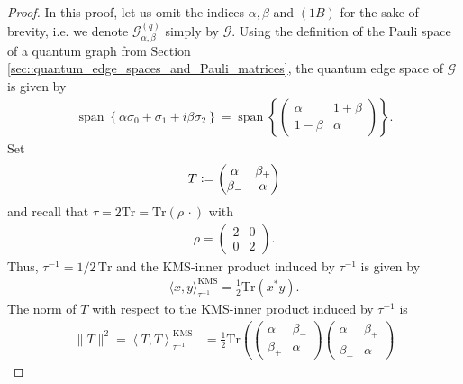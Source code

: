 \documentclass{amsart}
\newcommand{\Tr}{\mathrm{Tr}}
\DeclareMathOperator{\spann}{span}
\DeclareMathOperator{\KMS}{KMS}
\begin{document}
\begin{proof}
    In this proof, let us omit the indices $\alpha, \beta$ and $(1B)$ for the sake of brevity, i.e. we denote $\mathcal{G}_{\alpha, \beta}^{(q)}$ simply by $\mathcal{G}$.
    Using the definition of the Pauli space of a quantum graph from Section \ref{sec::quantum_edge_spaces_and_Pauli_matrices}, the quantum edge space of $\mathcal{G}$ is given by 
    \begin{align*}
        \spann\left\{
        \alpha \sigma_0 +\sigma_1+i\beta\sigma_2
        \right\}=
        \spann\left\{
        \begin{pmatrix}
            \alpha&1+\beta\\1-\beta&\alpha
        \end{pmatrix}
        \right\}.
    \end{align*}
    Set %
    \begin{align*}
        T\vcentcolon
        = \begin{pmatrix}
            \alpha&\beta_+\\\beta_-&\alpha
        \end{pmatrix}
    \end{align*}
    and recall that $\tau = 2 \mathrm{Tr} = \mathrm{Tr}(\rho \, \cdot)$ with
    \begin{align*}
        \rho = \begin{pmatrix}
            2 & 0 \\
            0 & 2
        \end{pmatrix}.
    \end{align*}
    Thus, $\tau^{-1} = 1/2\, \mathrm{Tr}$ and the KMS-inner product induced by $\tau^{-1}$ is given by 
    \begin{align*}
        \langle x, y \rangle_{\tau^{-1}}^{\KMS} = \frac{1}{2} \mathrm{Tr}(x^\ast y).
    \end{align*}
    The norm of $T$ with respect to the KMS-inner product induced by $\tau^{-1}$ is
    \begin{align*}
        \|T\|^2
        =\left\langle
        T,T
        \right\rangle_{\tau^{-1}}^{\KMS}
        &=\frac{1}{2} \Tr\left(
        \begin{pmatrix}
            \overline{\alpha}&\beta_-\\\beta_+&\overline{\alpha}
        \end{pmatrix}
        \begin{pmatrix}
            \alpha&\beta_+\\\beta_-&\alpha

\end{pmatrix}
\end{align*}
\end{proof}
\end{document}
